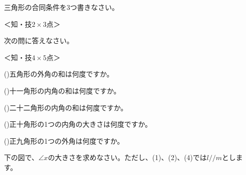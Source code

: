 \documentclass[
  12pt,a4paper,lualatex,ja=standard]{bxjsarticle}
\begin{document}
\begin{flushleft}
\vfill
\noindent{} \hspace{1pt}三角形の合同条件を3つ書きなさい。

%
\begin{flushright}%
\footnotesize{＜知・技$2\times 3$点＞}%
\end{flushright}%


\setcounter{skaunta}{0}

\vfill

\noindent{} \hspace{1pt}次の問に答えなさい。

%
\begin{flushright}%
\footnotesize{＜知・技$4\times 5$点＞}%
\end{flushright}%


()\hspace{2.5pt}五角形の外角の和は何度ですか。

\vspace{10mm}

()\hspace{2.5pt}十一角形の内角の和は何度ですか。

\vspace{10mm}

()\hspace{2.5pt}二十二角形の内角の和は何度ですか。

\vspace{10mm}

()\hspace{2.5pt}正十角形の1つの内角の大きさは何度ですか。

\vspace{10mm}

()\hspace{2.5pt}正九角形の1つの外角は何度ですか。

\vspace{10mm}

\vfill

\setcounter{skaunta}{0}

\newpage

\noindent{} \hspace{1pt}下の図で、$\angle x$の大きさを求めなさい。ただし、(1)、(2)、(4)では$l /\!/m$とします。


\end{flushleft}
\end{document}

